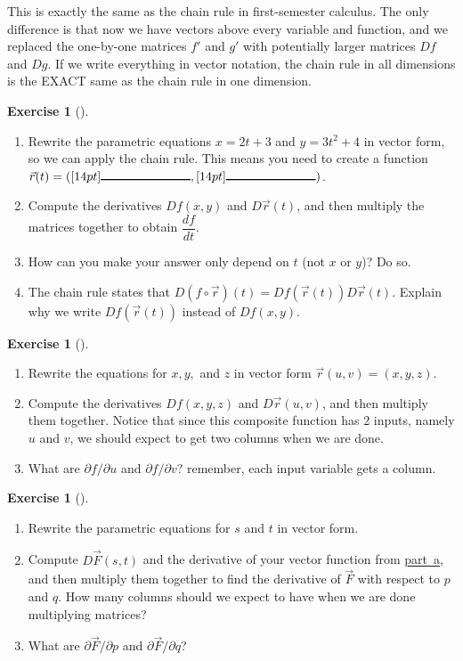 \documentclass[10pt,]{book}
\theoremstyle{plain}
\theoremstyle{definition}
\theoremstyle{definition}
\theoremstyle{definition}
\theoremstyle{definition}
\newtheorem{exploration}[project]{Exercise}
\theoremstyle{definition}
\numberwithin{equation}{section}
\newcommand{\blank}[1]{[14pt]{\rule{#1}{1pt}}}
\begin{document}
This is exactly the same as the chain rule in first-semester calculus. The only difference is that now we have vectors above every variable and function, and we replaced the one-by-one matrices \(f'\) and \(g'\) with potentially larger matrices \(Df\) and \(Dg\). If we write everything in vector notation, the chain rule in all dimensions is the EXACT same as the chain rule in one dimension.%
\begin{exploration}[]\label{exploration-154}
\leavevmode%
\begin{enumerate}[font=\bfseries,label=(\alph*),ref=\alph*]
\item\label{task-357} Rewrite the parametric equations \(x=2t+3\) and \(y=3t^2+4\) in vector form, so we can apply the chain rule. This means you need to create a function \(\vec r(t) = (\blank{1in}, \blank{1in})\).%
\item\label{task-358} Compute the derivatives \(Df(x,y)\) and \(D\vec r(t)\), and then multiply the matrices together to obtain \(\dfrac{df}{dt}\).%
\item\label{task-359} How can you make your answer only depend on \(t\) (not \(x\) or \(y\))? Do so.%
\item\label{task-360} The chain rule states that \(D(f\circ \vec r)(t) = Df(\vec r(t))D\vec r(t)\). Explain why we write \(Df(\vec r(t))\) instead of \(Df(x,y)\).%
\end{enumerate}
\end{exploration}
\begin{exploration}[]\label{exploration-155}
\leavevmode%
\begin{enumerate}[font=\bfseries,label=(\alph*),ref=\alph*]
\item\label{task-361} Rewrite the equations for \(x,y,\) and \(z\) in vector form \(\vec r(u,v)=(x,y,z)\).%
\item\label{task-362} Compute the derivatives \(Df(x,y,z)\) and \(D\vec r(u,v)\), and then multiply them together. Notice that since this composite function has 2 inputs, namely \(u\) and \(v\), we should expect to get two columns when we are done.%
\item\label{task-363} What are \(\partial f/\partial u\) and \(\partial f/\partial v\)? remember, each input variable gets a column.%
%
\end{enumerate}
\end{exploration}
\begin{exploration}[]\label{exploration-156}
\leavevmode%
\begin{enumerate}[font=\bfseries,label=(\alph*),ref=\alph*]
\item\label{item_3} Rewrite the parametric equations for \(s\) and \(t\) in vector form.%
\item\label{task-365} Compute \(D\vec F(s,t)\) and the derivative of your vector function from \hyperref[item_3]{part~a}, and then multiply them together to find the derivative of \(\vec F\) with respect to \(p\) and \(q\).  How many columns should we expect to have when we are done multiplying matrices?%
\item\label{task-366} What are \(\partial \vec F/\partial p\) and \(\partial \vec F/\partial q\)?%
\end{enumerate}
\end{exploration}
\end{document}
